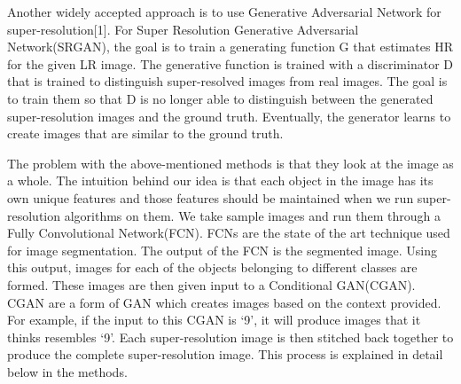 Another widely accepted approach is to use Generative Adversarial Network for
super-resolution[1]. For Super Resolution Generative Adversarial Network(SRGAN),
the goal is to train a generating function G that estimates HR for the given LR
image. The generative function is trained with a discriminator D that is trained
to distinguish super-resolved images from real images. The goal is to train them
so that D is no longer able to distinguish between the generated
super-resolution images and the ground truth. Eventually, the generator learns
to create images that are similar to the ground truth.

The problem with the above-mentioned methods is that they look at the image as a
whole. The intuition behind our idea is that each object in the image has its
own unique features and those features should be maintained when we run
super-resolution algorithms on them. We take sample images and run them through
a Fully Convolutional Network(FCN). FCNs are the state of the art technique used
for image segmentation. The output of the FCN is the segmented image. Using this
output, images for each of the objects belonging to different classes are
formed. These images are then given input to a Conditional GAN(CGAN). CGAN are a
form of GAN which creates images based on the context provided. For example, if
the input to this CGAN is ‘9’, it will produce images that it thinks resembles
‘9’. Each super-resolution image is then stitched back together to produce the
complete super-resolution image. This process is explained in detail below in
the methods.
